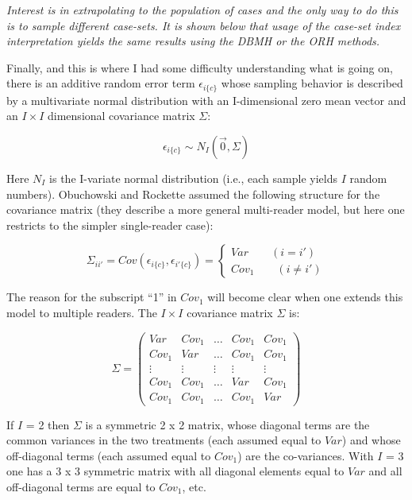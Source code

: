 \documentclass[
]{book}
\begin{document}
\emph{Interest is in extrapolating to the population of cases and the only way to do this is to sample different case-sets. It is shown below that usage of the case-set index interpretation yields the same results using the DBMH or the ORH methods.}

Finally, and this is where I had some difficulty understanding what is going on, there is an additive random error term \(\epsilon_{i\{c\}}\) whose sampling behavior is described by a multivariate normal distribution with an I-dimensional zero mean vector and an \(I \times I\) dimensional covariance matrix \(\Sigma\):

\begin{equation}
\epsilon_{i\{c\}} \sim N_I\left ( \vec{0} ,  \Sigma\right )
\label{eq:DefinitionEpsilon}
\end{equation}

Here \(N_I\) is the I-variate normal distribution (i.e., each sample yields \(I\) random numbers). Obuchowski and Rockette assumed the following structure for the covariance matrix (they describe a more general multi-reader model, but here one restricts to the simpler single-reader case):

\begin{equation}
\Sigma_{ii'}=Cov\left ( \epsilon_{i\{c\}}, \epsilon_{i'\{c\}} \right )=\left\{\begin{matrix}
Var \qquad (i=i')\\ 
Cov_1 \qquad (i\neq i')
\end{matrix}\right.
\label{eq:DefinitionSigma}
\end{equation}

The reason for the subscript ``1'' in \(Cov_1\) will become clear when one extends this model to multiple readers. The \(I \times I\) covariance matrix \(\Sigma\) is:

\begin{equation}
\Sigma=
\begin{pmatrix}
Var & Cov_1   & \ldots & Cov_1 & Cov_1 \\
Cov_1 & Var   & \ldots &Cov_1 & Cov_1 \\
\vdots & \vdots & \vdots & \vdots & \vdots \\
Cov_1 & Cov_1 & \ldots & Var & Cov_1 \\
Cov_1 & Cov_1 & \ldots & Cov_1 & Var
\end{pmatrix}
\label{eq:ExampleSigma}
\end{equation}

If \(I\) = 2 then \(\Sigma\) is a symmetric 2 x 2 matrix, whose diagonal terms are the common variances in the two treatments (each assumed equal to \(Var\)) and whose off-diagonal terms (each assumed equal to \(Cov_1\)) are the co-variances. With \(I\) = 3 one has a 3 x 3 symmetric matrix with all diagonal elements equal to \(Var\) and all off-diagonal terms are equal to \(Cov_1\), etc.
\end{document}
